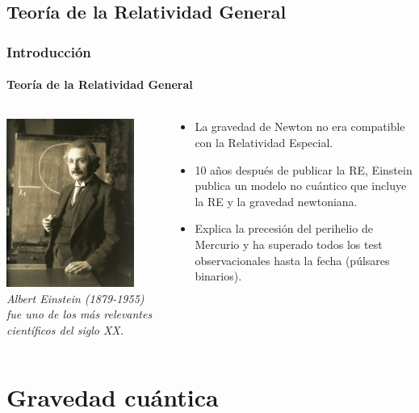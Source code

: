 \documentclass{beamer}
\begin{document}
\subsection{Teoría de la Relatividad General}
\begin{frame}
\frametitle{Introducción}
\framesubtitle{Teoría de la Relatividad General}
\begin{columns}[c]
  \begin{column}{.5\textwidth}
    \centering
    \includegraphics[height=5.5cm]{einstein} \\
    {\em\small Albert Einstein (1879-1955) fue uno de los más relevantes científicos del siglo XX.}
  \end{column}
  \begin{column}{.5\textwidth}
    \begin{itemize}
      \item La gravedad de Newton no era compatible con la Relatividad Especial.
      \item 10 años después de publicar la RE, Einstein publica un modelo no cuántico que incluye la RE y la gravedad newtoniana.
      \item Explica la precesión del perihelio de Mercurio y ha superado todos los test observacionales hasta la fecha (púlsares binarios).
    \end{itemize}
\end{column}
\end{columns}
\end{frame}

\section{Gravedad cuántica}
\end{document}
